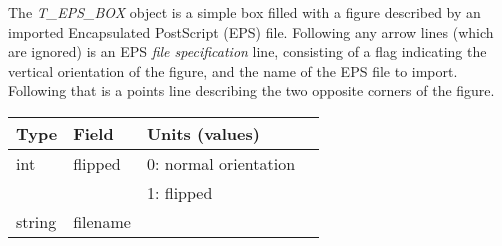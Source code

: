 The {\em T\_EPS\_BOX} object is a simple box filled with a figure
	described by an imported Encapsulated PostScript (EPS) file.
Following any arrow lines (which are ignored) is an EPS
	{\em file specification} line, consisting of a flag indicating
	the vertical orientation of the figure, and the name of the EPS file
	to import. Following that is a points line describing the two
	opposite corners of the figure.
%
\begin{center}
\begin{tabular} {|l|l|ll|}
\hline
Type	& Field			& Units (values)	&	\\ \hline
\hline
%
int	& flipped		& 0: normal orientation	&	\\
	&			& 1: flipped		&	\\ \hline
string	& filename		&			&	\\ \hline
\end{tabular}
\end{center}


